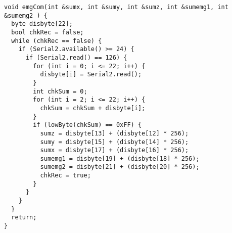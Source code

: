 \begin{lstlisting}[frame=single,language=Arduino] 
void emgCom(int &sumx, int &sumy, int &sumz, int &sumemg1, int &sumemg2 ) {
  byte disbyte[22];
  bool chkRec = false;
  while (chkRec == false) {
    if (Serial2.available() >= 24) {
      if (Serial2.read() == 126) {
        for (int i = 0; i <= 22; i++) {
          disbyte[i] = Serial2.read();
        }
        int chkSum = 0;
        for (int i = 2; i <= 22; i++) {
          chkSum = chkSum + disbyte[i];
        }
        if (lowByte(chkSum) == 0xFF) {
          sumz = disbyte[13] + (disbyte[12] * 256);
          sumy = disbyte[15] + (disbyte[14] * 256);
          sumx = disbyte[17] + (disbyte[16] * 256);
          sumemg1 = disbyte[19] + (disbyte[18] * 256);
          sumemg2 = disbyte[21] + (disbyte[20] * 256);
          chkRec = true;
        }
      }
    }
  }
  return;
}
\end{lstlisting}